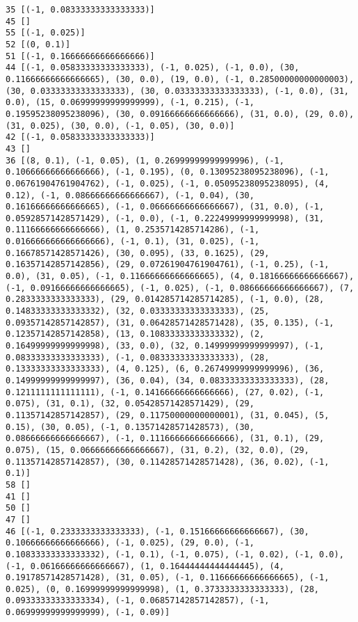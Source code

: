 \documentclass[11pt]{article}
\begin{document}
    \begin{Verbatim}[commandchars=\\\{\}]
35 [(-1, 0.08333333333333333)]
45 []
55 [(-1, 0.025)]
52 [(0, 0.1)]
51 [(-1, 0.16666666666666666)]
44 [(-1, 0.05833333333333333), (-1, 0.025), (-1, 0.0), (30, 0.11666666666666665), (30, 0.0), (19, 0.0), (-1, 0.28500000000000003), (30, 0.03333333333333333), (30, 0.03333333333333333), (-1, 0.0), (31, 0.0), (15, 0.06999999999999999), (-1, 0.215), (-1, 0.19595238095238096), (30, 0.09166666666666666), (31, 0.0), (29, 0.0), (31, 0.025), (30, 0.0), (-1, 0.05), (30, 0.0)]
42 [(-1, 0.05833333333333333)]
43 []
36 [(8, 0.1), (-1, 0.05), (1, 0.26999999999999996), (-1, 0.10666666666666666), (-1, 0.195), (0, 0.13095238095238096), (-1, 0.06761904761904762), (-1, 0.025), (-1, 0.05095238095238095), (4, 0.12), (-1, 0.08666666666666667), (-1, 0.04), (30, 0.16166666666666665), (-1, 0.06666666666666667), (31, 0.0), (-1, 0.05928571428571429), (-1, 0.0), (-1, 0.22249999999999998), (31, 0.11166666666666666), (1, 0.2535714285714286), (-1, 0.016666666666666666), (-1, 0.1), (31, 0.025), (-1, 0.16678571428571426), (30, 0.095), (33, 0.1625), (29, 0.16357142857142856), (29, 0.07261904761904761), (-1, 0.25), (-1, 0.0), (31, 0.05), (-1, 0.11666666666666665), (4, 0.18166666666666667), (-1, 0.09166666666666665), (-1, 0.025), (-1, 0.08666666666666667), (7, 0.2833333333333333), (29, 0.014285714285714285), (-1, 0.0), (28, 0.14833333333333332), (32, 0.03333333333333333), (25, 0.09357142857142857), (31, 0.06428571428571428), (35, 0.135), (-1, 0.12357142857142858), (13, 0.10833333333333332), (2, 0.16499999999999998), (33, 0.0), (32, 0.14999999999999997), (-1, 0.08333333333333333), (-1, 0.08333333333333333), (28, 0.13333333333333333), (4, 0.125), (6, 0.26749999999999996), (36, 0.14999999999999997), (36, 0.04), (34, 0.08333333333333333), (28, 0.1211111111111111), (-1, 0.14166666666666666), (27, 0.02), (-1, 0.075), (31, 0.1), (32, 0.05428571428571429), (29, 0.11357142857142857), (29, 0.11750000000000001), (31, 0.045), (5, 0.15), (30, 0.05), (-1, 0.13571428571428573), (30, 0.08666666666666667), (-1, 0.11166666666666666), (31, 0.1), (29, 0.075), (15, 0.06666666666666667), (31, 0.2), (32, 0.0), (29, 0.11357142857142857), (30, 0.11428571428571428), (36, 0.02), (-1, 0.1)]
58 []
41 []
50 []
47 []
46 [(-1, 0.2333333333333333), (-1, 0.15166666666666667), (30, 0.10666666666666666), (-1, 0.025), (29, 0.0), (-1, 0.10833333333333332), (-1, 0.1), (-1, 0.075), (-1, 0.02), (-1, 0.0), (-1, 0.06166666666666667), (1, 0.16444444444444445), (4, 0.19178571428571428), (31, 0.05), (-1, 0.11666666666666665), (-1, 0.025), (0, 0.16999999999999998), (1, 0.3733333333333333), (28, 0.09333333333333334), (-1, 0.06857142857142857), (-1, 0.06999999999999999), (-1, 0.09)]

\end{Verbatim}
\end{document}
